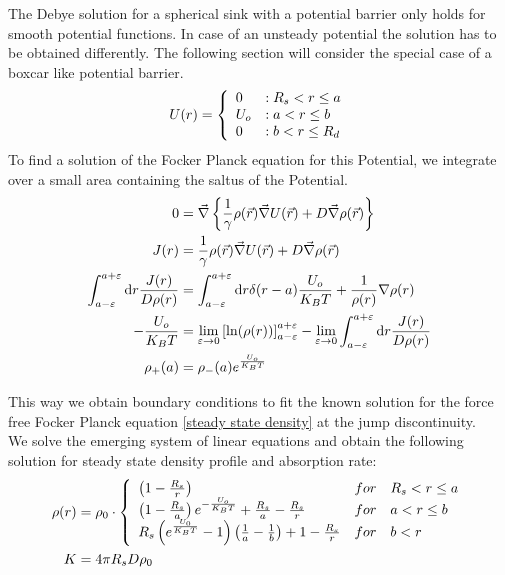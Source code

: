The Debye solution for a spherical sink with a potential barrier only holds for smooth potential functions. In case of an unsteady potential the solution has to be obtained differently. The following section will consider the special case of a boxcar like potential barrier.
\begin{equation}
    U(r) = \left\{ \begin{array}{l l} 
        0 &: R_s < r \le a \\
        U_o &: a<r \le b \\
        0 &: b < r \le R_d
    \end{array} \right.
    \label{Boxcar_Potential}
\end{equation}
To find a solution of the Focker Planck equation for this Potential, we integrate over a small area containing the saltus of the Potential. 
\begin{align}
    0 &= \vec{\nabla} \left\{ \frac{1}{\gamma} \rho(\vec{r}) \vec{\nabla} U(\vec{r}) + D \vec{\nabla} \rho(\vec{r}) \right\} \\
    J(r) &=  \frac{1}{\gamma} \rho(\vec{r}) \vec{\nabla} U(\vec{r}) + D \vec{\nabla} \rho(\vec{r}) \\
    \int_{a - \varepsilon}^{a + \varepsilon} {\rm d} r \frac{J(r)}{D\rho(r)} &= \int_{a - \varepsilon}^{a + \varepsilon} {\rm d} r \delta(r - a) \frac{U_o}{K_B T} + \frac{1}{\rho(r)} \nabla \rho(r) \\
    -\frac{U_o}{K_B T} &= \lim_{\varepsilon \rightarrow 0} \left[ \ln (\rho(r) ) \right]_{a - \varepsilon}^{a + \varepsilon} - \lim_{\varepsilon \rightarrow 0}\int_{a - \varepsilon}^{a + \varepsilon} {\rm d} r \frac{J(r)}{D\rho(r)} \\
    \rho_{+}(a) &= \rho_{-}(a) e^{\frac{U_o}{K_B T}}
    \label{Boxcar_BC}
\end{align}

This way we obtain boundary conditions to fit the known solution for the force free Focker Planck equation \eqref{steady state density} at the jump discontinuity.\\
We solve the emerging system of linear equations and obtain the following solution for steady state density profile and absorption rate:
\begin{align}
    \rho(r) &= \rho_0 \cdot \left\{ \begin{array}{ l l}
                                     \left(1 - \frac{R_s}{r} \right) & for \quad R_s < r \le a \\
                                     \left( 1 - \frac{R_s}{a} \right) e^{-\frac{U_o}{K_B T}} + \frac{R_s}{a} - \frac{R_s}{r} & for \quad a < r \le b \\
                                     R_s \left(e^{\frac{U_0}{K_B T}} - 1\right) \left( \frac{1}{a} - \frac{1}{b} \right) + 1 - \frac{R_s}{r}  & for \quad b < r 
                            \end{array} \right. \\
    K &= 4 \pi R_s D \rho_0
    \label{Boxcar_solution}
\end{align}
